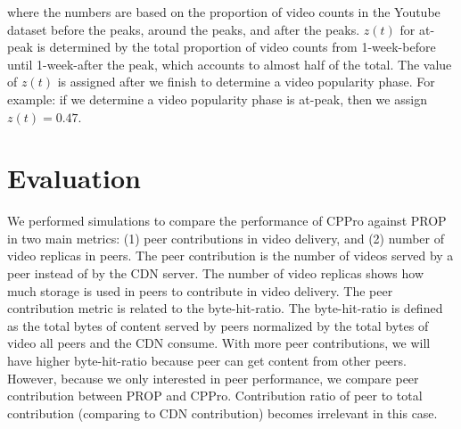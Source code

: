 where the numbers are based on the proportion of video counts in the Youtube dataset before the peaks, around the peaks, and after the peaks. 
$z(t)$ for at-peak is determined by the total proportion of video counts from 1-week-before until 1-week-after the peak, which accounts to almost half of the total.
The value of $z(t)$ is assigned after we finish to determine a video popularity phase.  
For example: if we determine a video popularity phase is at-peak, then we assign $z(t)=0.47$.





\section{Evaluation}\label{evaluation}
We performed simulations to compare the performance of CPPro against PROP in two main metrics: (1) peer contributions in video delivery, and (2) number of video replicas in peers.
The peer contribution is the number of videos served by a peer instead of by the CDN server.
The number of video replicas shows how much storage is used in peers to contribute in video delivery.
The peer contribution metric is related to the byte-hit-ratio. 
The byte-hit-ratio is defined as the total bytes of content served by peers normalized by the total bytes of video all peers and the CDN consume.
With more peer contributions, we will have higher byte-hit-ratio because peer can get content from other peers. 
However, because we only interested in peer performance, we compare peer contribution between PROP and CPPro.
Contribution ratio of peer to total contribution (comparing to CDN contribution) becomes irrelevant in this case.


